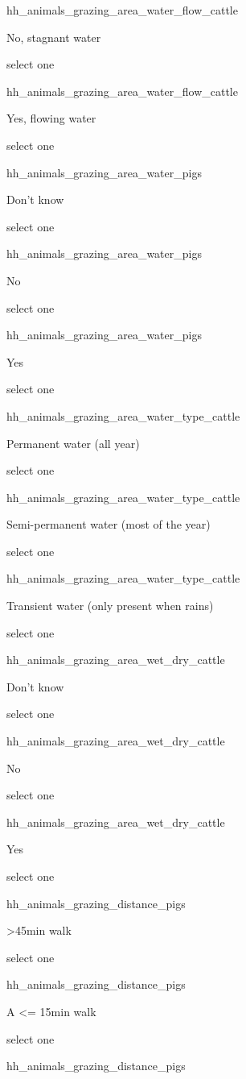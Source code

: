 \documentclass[]{article}
\begin{document}
hh\_animals\_grazing\_area\_water\_flow\_cattle

No, stagnant water

select one

hh\_animals\_grazing\_area\_water\_flow\_cattle

Yes, flowing water

select one

hh\_animals\_grazing\_area\_water\_pigs

Don't know

select one

hh\_animals\_grazing\_area\_water\_pigs

No

select one

hh\_animals\_grazing\_area\_water\_pigs

Yes

select one

hh\_animals\_grazing\_area\_water\_type\_cattle

Permanent water (all year)

select one

hh\_animals\_grazing\_area\_water\_type\_cattle

Semi-permanent water (most of the year)

select one

hh\_animals\_grazing\_area\_water\_type\_cattle

Transient water (only present when rains)

select one

hh\_animals\_grazing\_area\_wet\_dry\_cattle

Don't know

select one

hh\_animals\_grazing\_area\_wet\_dry\_cattle

No

select one

hh\_animals\_grazing\_area\_wet\_dry\_cattle

Yes

select one

hh\_animals\_grazing\_distance\_pigs

\textgreater{}45min walk

select one

hh\_animals\_grazing\_distance\_pigs

A \textless{}= 15min walk

select one

hh\_animals\_grazing\_distance\_pigs
\end{document}
